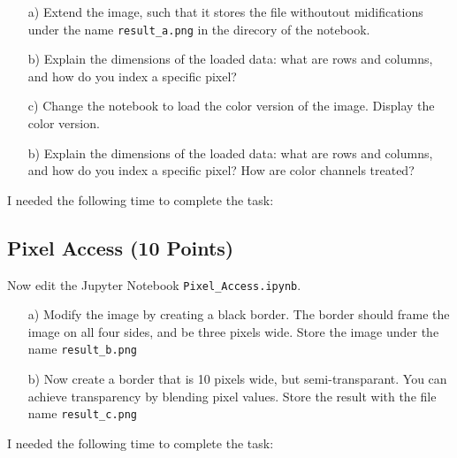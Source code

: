 \begin{enumerate}
\item[a)] Extend the image, such that it stores the file withoutout midifications under the name \texttt{result\_a.png} in the direcory of the notebook. 
\item[b)] Explain the dimensions of the loaded data: what are rows and columns, and how do you index a specific pixel?
\item[c)] Change the notebook to load the color version of the image. Display the color version.
\item[b)] Explain the dimensions of the loaded data: what are rows and columns, and how do you index a specific pixel? How are color channels treated?
\end{enumerate}

I needed the following time to complete the task:

\subsection{Pixel Access (10 Points)}

Now edit the Jupyter Notebook \texttt{Pixel\_Access.ipynb}. 

\begin{enumerate}
\item[a)] Modify the image by creating a black border. The border should frame the image on all four sides, and be three pixels wide. Store the image under the name \texttt{result\_b.png}
\item[b)] Now create a border that is 10 pixels wide, but semi-transparant. You can achieve transparency by blending pixel values. Store the result with the file name \texttt{result\_c.png}
\end{enumerate}

I needed the following time to complete the task:

